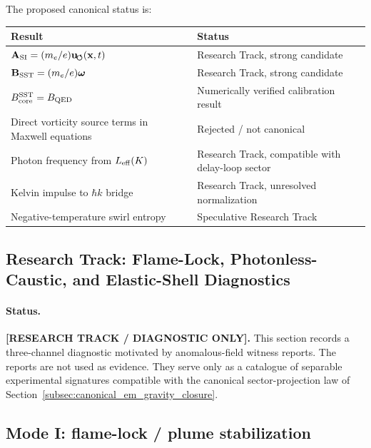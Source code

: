 The proposed canonical status is:

\begin{center}
    \begin{tabular}{ll}
        \hline
        Result & Status \\
        \hline
        \(\mathbf{A}_{\rm SI}=(m_e/e)\mathbf{u}_{\!\boldsymbol{\circlearrowleft}}(\mathbf{x},t)\) & Research Track, strong candidate \\
        \(\mathbf{B}_{\rm SST}=(m_e/e)\boldsymbol{\omega}\) & Research Track, strong candidate \\
        \(B_{\rm core}^{\rm SST}=B_{\rm QED}\) & Numerically verified calibration result \\
        Direct vorticity source terms in Maxwell equations & Rejected / not canonical \\
        Photon frequency from \(L_{\rm eff}(K)\) & Research Track, compatible with delay-loop sector \\
        Kelvin impulse to \(\hbar k\) bridge & Research Track, unresolved normalization \\
        Negative-temperature swirl entropy & Speculative Research Track \\
        \hline
    \end{tabular}
\end{center}

\subsection{Research Track: Flame-Lock, Photonless-Caustic, and Elastic-Shell Diagnostics}
\label{sec:rt_flame_photonless_shell}

\paragraph{Status.}
\textbf{[RESEARCH TRACK / DIAGNOSTIC ONLY].}
This section records a three-channel diagnostic motivated by anomalous-field
witness reports. The reports are not used as evidence. They serve only as a
catalogue of separable experimental signatures compatible with the canonical
sector-projection law of Section~\ref{subsec:canonical_em_gravity_closure}.

\subsection{Mode I: flame-lock / plume stabilization}

